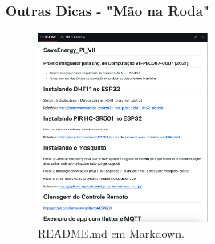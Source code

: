 \documentclass{beamer}
\begin{document}
\begin{frame}
  \frametitle{Outras Dicas - "Mão na Roda"}
  \begin{block}{}
    \begin{figure}
      \centering
      \includegraphics[width=0.5\textwidth]{readme_md.png} %
      \captionsetup{labelformat=simple, labelsep=period}
      \caption{README.md em Markdown.}
    \end{figure}
  \end{block}
\end{frame}
\end{document}
